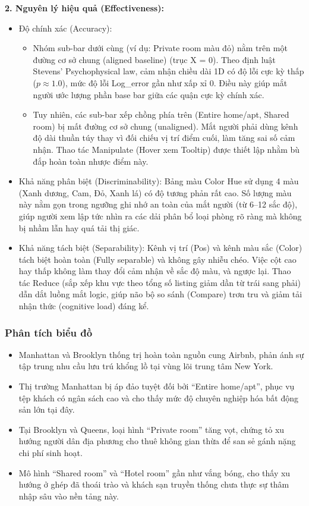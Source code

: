 \textbf{2. Nguyên lý hiệu quả (Effectiveness):}

\begin{itemize}
    \item Độ chính xác (Accuracy):
    \begin{itemize}
        \item Nhóm sub-bar dưới cùng (ví dụ: Private room màu đỏ) nằm trên một đường cơ sở chung (aligned baseline) (trục X = 0). Theo định luật Stevens' Psychophysical law, cảm nhận chiều dài 1D có độ lỗi cực kỳ thấp ($p \approx 1.0$), mức độ lỗi Log\_error gần như xấp xỉ $0$. Điều này giúp mắt người ước lượng phần base bar giữa các quận cực kỳ chính xác.
        \item Tuy nhiên, các sub-bar xếp chồng phía trên (Entire home/apt, Shared room) bị mất đường cơ sở chung (unaligned). Mắt người phải dùng kênh độ dài thuần túy thay vì đối chiếu vị trí điểm cuối, làm tăng sai số cảm nhận. Thao tác Manipulate (Hover xem Tooltip) được thiết lập nhằm bù đắp hoàn toàn nhược điểm này.
    \end{itemize}
    \item Khả năng phân biệt (Discriminability): Bảng màu Color Hue sử dụng 4 màu (Xanh dương, Cam, Đỏ, Xanh lá) có độ tương phản rất cao. Số lượng màu này nằm gọn trong ngưỡng ghi nhớ an toàn của mắt người (từ 6--12 sắc độ), giúp người xem lập tức nhìn ra các dải phân bổ loại phòng rõ ràng mà không bị nhầm lẫn hay quá tải thị giác.
    \item Khả năng tách biệt (Separability): Kênh vị trí (Pos) và kênh màu sắc (Color) tách biệt hoàn toàn (Fully separable) và không gây nhiễu chéo. Việc cột cao hay thấp không làm thay đổi cảm nhận về sắc độ màu, và ngược lại. Thao tác Reduce (sắp xếp khu vực theo tổng số listing giảm dần từ trái sang phải) dẫn dắt luồng mắt logic, giúp não bộ so sánh (Compare) trơn tru và giảm tải nhận thức (cognitive load) đáng kể.
\end{itemize}

\subsubsection{Phân tích biểu đồ}

\begin{itemize}
    \item Manhattan và Brooklyn thống trị hoàn toàn nguồn cung Airbnb, phản ánh sự tập trung nhu cầu lưu trú khổng lồ tại vùng lõi trung tâm New York.
    \item Thị trường Manhattan bị áp đảo tuyệt đối bởi ``Entire home/apt'', phục vụ tệp khách có ngân sách cao và cho thấy mức độ chuyên nghiệp hóa bất động sản lớn tại đây.
    \item Tại Brooklyn và Queens, loại hình ``Private room'' tăng vọt, chứng tỏ xu hướng người dân địa phương cho thuê không gian thừa để san sẻ gánh nặng chi phí sinh hoạt.
    \item Mô hình ``Shared room'' và ``Hotel room'' gần như vắng bóng, cho thấy xu hướng ở ghép đã thoái trào và khách sạn truyền thống chưa thực sự thâm nhập sâu vào nền tảng này.
\end{itemize}
